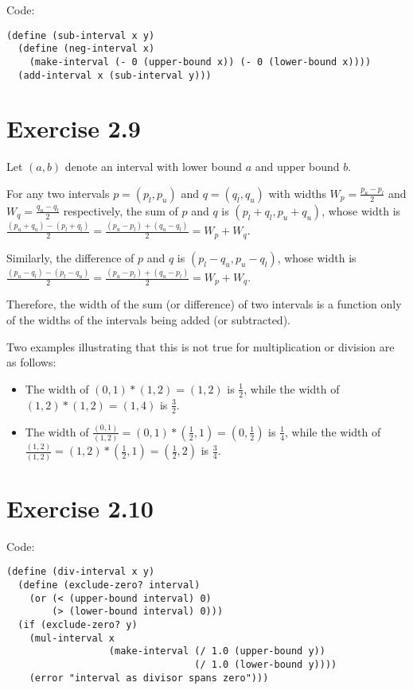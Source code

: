 \documentclass[../main.tex]{subfiles}
\begin{document}
Code:

\begin{lstlisting}
(define (sub-interval x y)
  (define (neg-interval x)
    (make-interval (- 0 (upper-bound x)) (- 0 (lower-bound x))))
  (add-interval x (sub-interval y)))
\end{lstlisting}

\section{Exercise 2.9}

Let $(a, b)$ denote an interval with
 lower bound $a$ and upper bound $b$.

For any two intervals $p=(p_l, p_u)$
 and $q=(q_l, q_u)$ with widths $W_p = \frac{p_u - p_l}{2}$
 and $W_q = \frac{q_u - q_l}{2}$
 respectively, the sum of $p$ and $q$ is
 $(p_l + q_l, p_u + q_u)$, whose width is
 $\frac{(p_u + q_u) - (p_l + q_l)}{2} =
 \frac{(p_u - p_l) + (q_u - q_l)}{2} = W_p + W_q$.

Similarly, the difference of $p$ and $q$ is
 $(p_l - q_u, p_u - q_l)$, whose width is
 $\frac{(p_u - q_l) - (p_l - q_u)}{2} = 
 \frac{(p_u - p_l) + (q_u - p_l)}{2} = W_p + W_q$.

Therefore, the width of the sum (or difference) of two
 intervals is a function only of the widths of the intervals
 being added (or subtracted).

Two examples illustrating that this is not true for
 multiplication or division are as follows:

\begin{itemize}
\item The width of $(0, 1) * (1, 2) = (1, 2)$ is $\frac{1}{2}$,
 while the width of $(1, 2) * (1, 2) = (1, 4)$ is $\frac{3}{2}$.
\item The width of $\frac{(0, 1)}{(1, 2)} = (0, 1) *
 (\frac{1}{2}, 1) = (0, \frac{1}{2})$ is $\frac{1}{4}$,
 while the width of $\frac{(1, 2)}{(1, 2)} = (1, 2) *
 (\frac{1}{2}, 1) = (\frac{1}{2}, 2)$ is $\frac{3}{4}$.
\end{itemize}

\section{Exercise 2.10}

Code:

\begin{lstlisting}
(define (div-interval x y)
  (define (exclude-zero? interval)
    (or (< (upper-bound interval) 0)
        (> (lower-bound interval) 0)))
  (if (exclude-zero? y)
    (mul-interval x
                  (make-interval (/ 1.0 (upper-bound y))
                                 (/ 1.0 (lower-bound y))))
    (error "interval as divisor spans zero")))
\end{lstlisting}
\end{document}
